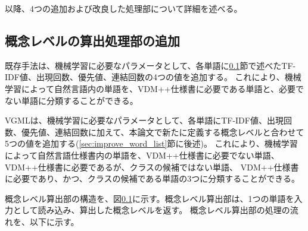 以降、4つの追加および改良した処理部について詳細を述べる。

\subsection{概念レベルの算出処理部の追加}
既存手法は、機械学習に必要なパラメータとして、各単語に\ref{}節で述べたTF-IDF値、出現回数、優先値、連結回数の4つの値を追加する。
これにより、機械学習によって自然言語内の単語を、VDM++仕様書に必要である単語と、必要でない単語に分類することができる。

VGMLは、機械学習に必要なパラメータとして、各単語にTF-IDF値、出現回数、優先値、連結回数に加えて、本論文で新たに定義する概念レベルと合わせて5つの値を追加する(\ref{sec:improve_word_list}節に後述)。
これにより、機械学習によって自然言語仕様書内の単語を、VDM++仕様書に必要でない単語、VDM++仕様書に必要であるが、クラスの候補ではない単語、
VDM++仕様書に必要であり、かつ、クラスの候補である単語の3つに分類することができる。

概念レベル算出部の構造を、図\ref{}に示す。概念レベル算出部は、1つの単語を入力として読み込み、算出した概念レベルを返す。
概念レベル算出部の処理の流れを、以下に示す。

